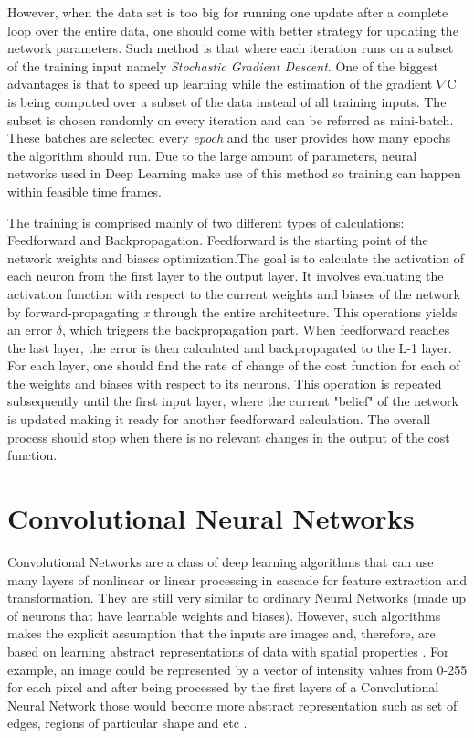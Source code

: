 However, when the data set is too big for running one update after a complete loop over the entire data, one should come with better strategy for updating the network parameters. Such method is that where each iteration runs on a subset of the training input namely \textit{Stochastic Gradient Descent}. One of the biggest advantages is that to speed up learning while the estimation of the gradient $\nabla$C is being computed over a subset of the data instead of all training inputs. The subset is chosen randomly on every iteration and can be referred as mini-batch. These batches are selected every \textit{epoch} and the user provides how many epochs the algorithm should run. Due to the large amount of parameters, neural networks used in Deep Learning make use of this method so training can happen within feasible time frames.


The training is comprised mainly of two different types of calculations: Feedforward and Backpropagation. Feedforward is the starting point of the network weights and biases optimization.The goal is to calculate the activation of each neuron from the first layer to the output layer. It involves evaluating the activation function with respect to the current weights and biases of the network by forward-propagating \textit{x} through the entire architecture. This operations yields an error $\delta$, which triggers the backpropagation part. When feedforward reaches the last layer, the error is then calculated and backpropagated to the L-1 layer. For each layer, one should find the rate of change of the cost function for each of the weights and biases with respect to its neurons. This operation is repeated subsequently until the first input layer, where the current "belief" of the network is updated making it ready for another feedforward calculation. The overall process should stop when there is no relevant changes in the output of the cost function.

\section{Convolutional Neural Networks}

Convolutional Networks are a class of deep learning algorithms that can use many layers of nonlinear or linear processing in cascade for feature extraction and transformation. They are still very similar to ordinary Neural Networks (made up of neurons that have learnable weights and biases). However, such algorithms makes the explicit assumption that the inputs are images and, therefore, are based on learning abstract representations of data with spatial properties \cite{goodfellow2016_book}. For example, an image could be represented by a vector of intensity values from 0-255 for each pixel and after being processed by the first layers of a Convolutional Neural Network those would become more abstract representation such as set of edges, regions of particular shape and etc \cite{stanford2016}.

